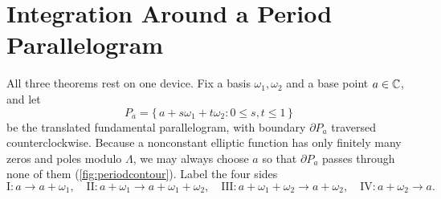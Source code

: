 \section{Integration Around a Period Parallelogram}
\label{sec:ell-contour}

All three theorems rest on one device. Fix a basis \(\omega_1, \omega_2\) and a
base point \(a \in \mathbb{C}\), and let
\[
  P_a = \{\, a + s\omega_1 + t\omega_2 : 0 \le s, t \le 1 \,\}
\]
be the translated fundamental parallelogram, with boundary \(\partial P_a\)
traversed counterclockwise. Because a nonconstant elliptic function has only
finitely many zeros and poles modulo \(\Lambda\), we may always choose \(a\) so
that \(\partial P_a\) passes through none of them
(\cref{fig:periodcontour}). Label the four sides
\[
  \mathrm{I}: a \to a{+}\omega_1, \quad
  \mathrm{II}: a{+}\omega_1 \to a{+}\omega_1{+}\omega_2, \quad
  \mathrm{III}: a{+}\omega_1{+}\omega_2 \to a{+}\omega_2, \quad
  \mathrm{IV}: a{+}\omega_2 \to a .
\]

